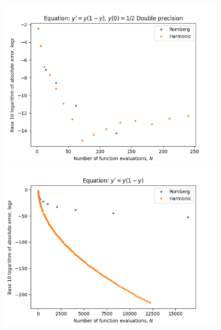 \begin{figure}[H]
\centering
\begin{minipage}{0.45\textwidth}
\centering
\includegraphics[scale=0.45]{../results/emr_plots/logistic.png}
\end{minipage}
\begin{minipage}{0.45\textwidth}
\centering
\includegraphics[scale=0.45]{../results/emr_plots/logistic_hp.png}
\end{minipage}
\end{figure}

